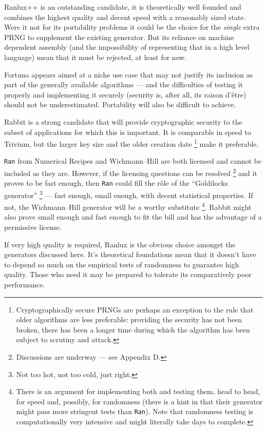 \documentclass[letterpaper,12pt]{article}
\begin{document}
\vspace{0.5cm}

Ranlux++ is an outstanding candidate, it is theoretically well founded and
combines the highest quality and decent speed with a reasonably sized
state. Were it not for its portability problems it could be the choice for
the {\em single} extra PRNG to supplement the existing generator. But its
reliance on machine dependent assembly (and the impossibility of
representing that in a high level language) mean that it must be rejected,
at least for now.

Fortuna appears aimed at a niche use case that may not justify its
inclusion as part of the generally available algorithms --- and the
difficulties of testing it properly and implementing it securely (security
is, after all, its raison d'\^{e}tre) should not be
underestimated. Portability will also be difficult to achieve.

Rabbit is a strong candidate that will provide cryptographic security
to the subset of applications for which this is important. It is comparable
in speed to Trivium, but the larger key size and the older creation date%
\footnote{
  Cryptographically secure PRNGs are perhaps an exception to the rule that
  older algorithms are less preferable: providing the security has not
  been broken, there has been a longer time during which the algorithm has
  been subject to scrutiny and attack.
  }
make it preferable.

\texttt{Ran} from Numerical Recipes and Wichmann--Hill are both licensed
and cannot be included as they are. However, if the licensing questions can
be resolved%
\footnote{
  Discussions are underway --- see Appendix D.
  }
and it proves to be fast enough, then \texttt{Ran} could fill the r\^ole
of the ``Goldilocks generator''%
\footnote{
  Not too hot, not too cold, just right.
}
--- fast enough, small enough, with decent statistical properties.
If not, the Wichmann--Hill generator will be a worthy
substitute%
\footnote{
  There is an argument for implementing both and testing them, head to
  head, for speed and, possibly, for randomness (there is a hint in
  \cite{WichmannHill:2006} that their generator might pass more stringent
  tests than \texttt{Ran}). Note that randomness testing is computationally
  very intensive and might literally take days to complete.
}.
Rabbit might also prove small enough and fast enough to fit the bill and
has the advantage of a permissive license.

If very high quality is required, Ranlux is the obvious choice amongst
the generators discussed here. It's theoretical foundations mean that it
doesn't have to depend so much on the empirical tests of randomness to
guarantee high quality. Those who need it may be prepared to tolerate its
comparatively poor performance.
\end{document}
